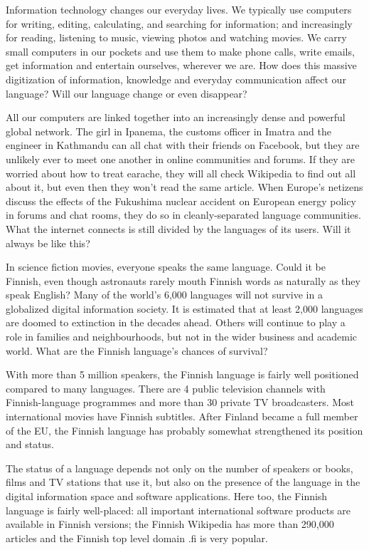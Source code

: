 \begin{multicols}{2}

Information technology changes our everyday lives. We typically use computers for writing, editing, calculating, and searching for information; and increasingly for reading, listening to music, viewing photos and watching movies. We carry small computers in our pockets and use them to make phone calls, write emails, get information and entertain ourselves, wherever we are. How does this massive digitization of information, knowledge and everyday communication affect our language? Will our language change or even disappear? 

All our computers are linked together into an increasingly dense and powerful global network. The girl in Ipanema, the customs officer in Imatra and the engineer in Kathmandu can all chat with their friends on Facebook, but they are unlikely ever to meet one another in online communities and forums. If they are worried about how to treat earache, they will all check Wikipedia to find out all about it, but even then they won’t read the same article. When Europe's netizens discuss the effects of the Fukushima nuclear accident on European energy policy in forums and chat rooms, they do so in cleanly-separated language communities. What the internet connects is still divided by the languages of its users. Will it always be like this? 

In science fiction movies, everyone speaks the same language. Could it be Finnish, even though astronauts rarely mouth Finnish words as naturally as they speak English? Many of the world’s 6,000 languages will not survive in a globalized digital information society. It is estimated that at least 2,000 languages are doomed to extinction in the decades ahead. Others will continue to play a role in families and neighbourhoods, but not in the wider business and academic world. What are the Finnish language’s chances of survival? 

With more than 5 million speakers, the Finnish language is fairly well positioned compared to many languages. There are 4 public television channels with Finnish-language programmes and more than 30 private TV broadcasters. Most international movies have Finnish subtitles. 
After Finland became a full member of the EU, the Finnish language has probably somewhat strengthened its position and status.

The status of a language depends not only on the number of speakers or books, films and TV stations that use it, but also on the presence of the language in the digital information space and software applications. Here too, the Finnish language is fairly well-placed: all important international software products are available in Finnish versions; the Finnish Wikipedia has more than 290,000 articles and the Finnish top level domain .fi is very popular.
 

\end{multicols}
